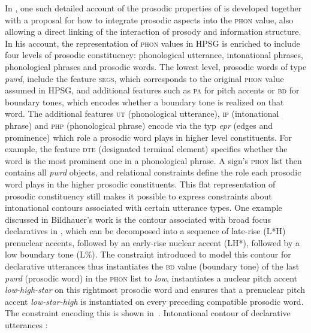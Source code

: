 \documentclass[output=paper
 	        ,biblatex
                ,babelshorthands
                ,newtxmath
                ,draftmode
                ,colorlinks, citecolor=brown
]{langscibook}
\begin{document}
In \cite{Bildhauer2008a}, one such detailed account of the prosodic
properties of  is developed together with a proposal for how to
integrate prosodic aspects into the \textsc{phon} value, also allowing
a direct linking of the interaction of prosody and information
structure.  In his account, the representation of \textsc{phon} values
in HPSG is enriched to include four levels of prosodic constituency:
phonological utterance, intonational phrases, phonological
phrases and prosodic words. The lowest level, prosodic words of type
\textit{pwrd}, include the feature \textsc{segs}, which corresponds to
the original \textsc{phon} value assumed in HPSG, and additional
features such as \textsc{pa} for pitch accents or \textsc{bd} for
boundary tones, which encodes whether a boundary tone is realized on that
word. The additional features \textsc{ut} (phonological utterance),
\textsc{ip} (intonational phrase) and \textsc{php} (phonological phrase)
encode via the typ \textit{epr} (edges and prominence) which role
a prosodic word plays in higher level constituents. For example, the
feature \textsc{dte} (designated terminal element) specifies whether
the word is the most prominent one in a phonological phrase. A sign's
\textsc{phon} list then contains all \textit{pwrd} objects, and
relational constraints define the role each prosodic word plays in
the higher prosodic constituents. This flat representation of prosodic
constituency still makes it possible to express constraints about intonational
contours associated with certain utterance types. One example
discussed in Bildhauer's work is the contour associated with broad
focus declaratives in , which can be decomposed into a
sequence of late-rise (L*H) prenuclear accents, followed by an
early-rise nuclear accent (LH*), followed by a low boundary tone
(L\%). The constraint introduced to model this contour for declarative
utterances thus instantiates the \textsc{bd} value (boundary tone) of
the last \textit{pwrd} (prosodic word) in the \textsc{phon} list to \textit{low}, instantiates
a nuclear pitch accent \textit{low-high-star} on this rightmost
prosodic word and ensures that a prenuclear pitch accent
\textit{low-star-high} is instantiated on every preceding compatible
prosodic word. The constraint encoding this is shown in~.
\ea
Intonational contour of  declarative utterances \citep[142]{Bildhauer2008a}:\\
\end{document}
